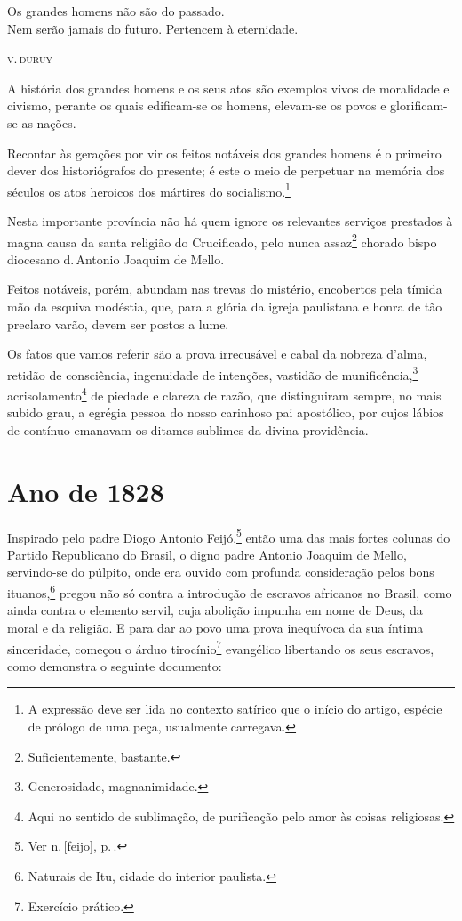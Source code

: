 
\epigraph{Os grandes homens não são do passado.\\
Nem serão jamais do futuro. Pertencem à eternidade.}{\textsc{v.\,duruy}\footnotemark}


A história dos grandes homens e os seus atos são exemplos vivos de
moralidade e civismo, perante os quais edificam-se os homens, elevam-se
os povos e glorificam-se as nações.

Recontar às gerações por vir os feitos notáveis dos grandes homens é o
primeiro dever dos historiógrafos do presente; é este o meio de
perpetuar na memória dos séculos os atos heroicos dos mártires do
socialismo.\footnote{A expressão deve ser lida no contexto satírico
  que o início do artigo, espécie de prólogo de uma peça, usualmente
  carregava.}

Nesta importante província não há quem ignore os relevantes serviços
prestados à magna causa da santa religião do Crucificado, pelo nunca
assaz\footnote{Suficientemente, bastante.} chorado bispo diocesano
d.\,Antonio Joaquim de Mello.

Feitos notáveis, porém, abundam nas trevas do mistério, encobertos pela
tímida mão da esquiva modéstia, que, para a glória da igreja paulistana
e honra de tão preclaro varão, devem ser postos a lume.

Os fatos que vamos referir são a prova irrecusável e cabal da nobreza
d'alma, retidão de consciência, ingenuidade de intenções, vastidão de
munificência,\footnote{Generosidade, magnanimidade.}
acrisolamento\footnote{Aqui no sentido de sublimação, de purificação
  pelo amor às coisas religiosas.} de piedade e clareza de razão, que
distinguiram sempre, no mais subido grau, a egrégia pessoa do nosso
carinhoso pai apostólico, por cujos lábios de contínuo emanavam os
ditames sublimes da divina providência.

\section{Ano de 1828}

Inspirado pelo padre Diogo Antonio Feijó,\footnote{Ver n.\,\ref{feijo}, p.\,\pageref{feijo}.} então uma das
mais fortes colunas do Partido Republicano do Brasil, o digno padre
Antonio Joaquim de Mello, servindo-se do púlpito, onde era ouvido com
profunda consideração pelos bons ituanos,\footnote{Naturais de Itu,
  cidade do interior paulista.} pregou não só contra a introdução de
escravos africanos no Brasil, como ainda contra o elemento servil, cuja
abolição impunha em nome de Deus, da moral e da religião. E para dar ao
povo uma prova inequívoca da sua íntima sinceridade, começou o árduo
tirocínio\footnote{Exercício prático.} evangélico libertando os seus
escravos, como demonstra o seguinte documento:

